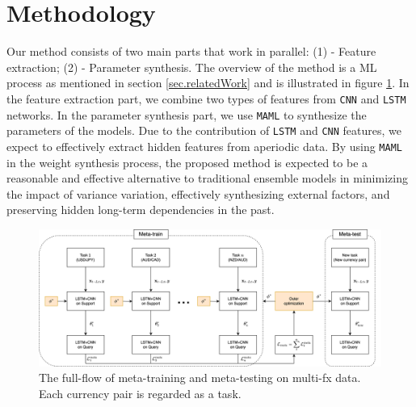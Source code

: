 \documentclass[aps,prb,groupedaddress,twocolumn,showpacs,dvipdfmx,superscriptaddress,pdftex]{revtex4-2}
\begin{document}
\section{Methodology}
\label{sec.method}


Our method consists of two main parts that work in parallel: (1) - Feature extraction; (2) - Parameter synthesis. The overview of the method is a ML process as mentioned in section \ref{sec.relatedWork} and is illustrated in figure \ref{fig:flow}. In the feature extraction part, we combine two types of features from \verb|CNN| and \verb|LSTM| networks. In the parameter synthesis part, we use \verb|MAML| to synthesize the parameters of the models. Due to the contribution of \verb|LSTM| and \verb|CNN| features, we expect to effectively extract hidden features from aperiodic data. By using \verb|MAML| in the weight synthesis process, the proposed method is expected to be a reasonable and effective alternative to traditional ensemble models in minimizing the impact of variance variation, effectively synthesizing external factors, and preserving hidden long-term dependencies in the past.

\begin{figure}[ht]
    \centering
    \includegraphics[width=\textwidth]{img/meta.png}
    \caption{The full-flow of meta-training and meta-testing on multi-fx data. Each currency pair is regarded as a task.}
    \label{fig:flow}
\end{figure}
\end{document}
